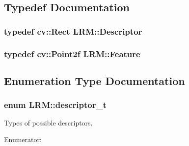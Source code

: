 \subsection{\-Typedef \-Documentation}
\hypertarget{namespaceLRM_aa94fd446417fb568723141ba14bde953}{
\subsubsection[{\-Descriptor}]{\setlength{\rightskip}{0pt plus 5cm}typedef cv\-::\-Rect {\bf \-L\-R\-M\-::\-Descriptor}}}\label{namespaceLRM_aa94fd446417fb568723141ba14bde953}
\hypertarget{namespaceLRM_a83d84534368107ba7cdbde260cfc3070}{
\subsubsection[{\-Feature}]{\setlength{\rightskip}{0pt plus 5cm}typedef cv\-::\-Point2f {\bf \-L\-R\-M\-::\-Feature}}}\label{namespaceLRM_a83d84534368107ba7cdbde260cfc3070}


\subsection{\-Enumeration \-Type \-Documentation}
\hypertarget{namespaceLRM_ad31d475a7f32e1bd208beb34aabc6fa9}{
\subsubsection[{descriptor\-\_\-t}]{\setlength{\rightskip}{0pt plus 5cm}enum {\bf \-L\-R\-M\-::descriptor\-\_\-t}}}\label{namespaceLRM_ad31d475a7f32e1bd208beb34aabc6fa9}


\-Types of possible descriptors. 

\begin{Desc}
\item[\-Enumerator\-: ]\par
\begin{description}
\item[{\em 
\hypertarget{namespaceLRM_ad31d475a7f32e1bd208beb34aabc6fa9a1e43a18048d2fc5fc782f2eebce0d585}{\-S\-S\-D}\label{namespaceLRM_ad31d475a7f32e1bd208beb34aabc6fa9a1e43a18048d2fc5fc782f2eebce0d585}
}]\end{description}
\end{Desc}

